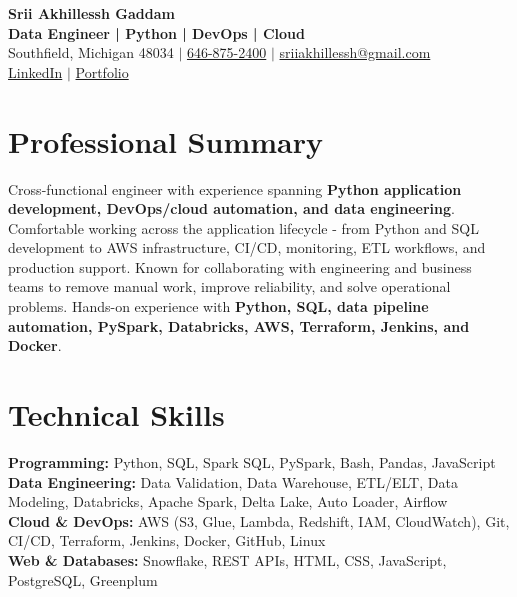 \documentclass[letterpaper,10pt]{article}
\begin{document}
\fontsize{9.35pt}{10.45pt}\selectfont

\begin{center}
    {\LARGE \textbf{Srii Akhillessh Gaddam}} \\[-1pt]
    \textbf{Data Engineer | Python | DevOps | Cloud} \\[2pt]
    Southfield, Michigan 48034 $|$
    \href{tel:6468752400}{646-875-2400} $|$
    \href{mailto:sriiakhillessh@gmail.com}{sriiakhillessh@gmail.com} \\[1pt]
    \href{https://www.linkedin.com/in/srii-akhiilessh-gaddam-b48668191/}{LinkedIn} $|$
    \href{https://sriiakhillesshg.github.io/portfolio/}{Portfolio}
\end{center}
\vspace{-8pt}

\section{Professional Summary}
\small{Cross-functional engineer with experience spanning \textbf{Python application development, DevOps/cloud automation, and data engineering}. Comfortable working across the application lifecycle - from Python and SQL development to AWS infrastructure, CI/CD, monitoring, ETL workflows, and production support. Known for collaborating with engineering and business teams to remove manual work, improve reliability, and solve operational problems. Hands-on experience with \textbf{Python, SQL, data pipeline automation, PySpark, Databricks, AWS, Terraform, Jenkins, and Docker}.}

\section{Technical Skills}
\small{
\textbf{Programming:} Python, SQL, Spark SQL, PySpark, Bash, Pandas, JavaScript \\
\textbf{Data Engineering:} Data Validation, Data Warehouse, ETL/ELT, Data Modeling, Databricks, Apache Spark, Delta Lake, Auto Loader, Airflow \\
\textbf{Cloud \& DevOps:} AWS (S3, Glue, Lambda, Redshift, IAM, CloudWatch), Git, CI/CD, Terraform, Jenkins, Docker, GitHub, Linux \\
\textbf{Web \& Databases:} Snowflake, REST APIs, HTML, CSS, JavaScript, PostgreSQL, Greenplum
}
\end{document}
